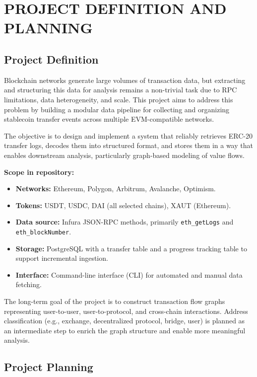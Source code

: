 \documentclass[a4paper,12pt]{report}
\begin{document}
\chapter{PROJECT DEFINITION AND PLANNING}

\section{Project Definition}

Blockchain networks generate large volumes of transaction data, but extracting and structuring this data for analysis remains a non-trivial task due to RPC limitations, data heterogeneity, and scale. This project aims to address this problem by building a modular data pipeline for collecting and organizing stablecoin transfer events across multiple EVM-compatible networks.

The objective is to design and implement a system that reliably retrieves ERC-20 transfer logs, decodes them into structured format, and stores them in a way that enables downstream analysis, particularly graph-based modeling of value flows.

\textbf{Scope in repository:}
\begin{itemize}
\item \textbf{Networks:} Ethereum, Polygon, Arbitrum, Avalanche, Optimism.
\item \textbf{Tokens:} USDT, USDC, DAI (all selected chains), XAUT (Ethereum).
\item \textbf{Data source:} Infura JSON-RPC methods, primarily \texttt{eth\_getLogs} and \texttt{eth\_blockNumber}.
\item \textbf{Storage:} PostgreSQL with a transfer table and a progress tracking table to support incremental ingestion.
\item \textbf{Interface:} Command-line interface (CLI) for automated and manual data fetching.
\end{itemize}

The long-term goal of the project is to construct transaction flow graphs representing user-to-user, user-to-protocol, and cross-chain interactions. Address classification (e.g., exchange, decentralized protocol, bridge, user) is planned as an intermediate step to enrich the graph structure and enable more meaningful analysis.

\section{Project Planning}
\end{document}
